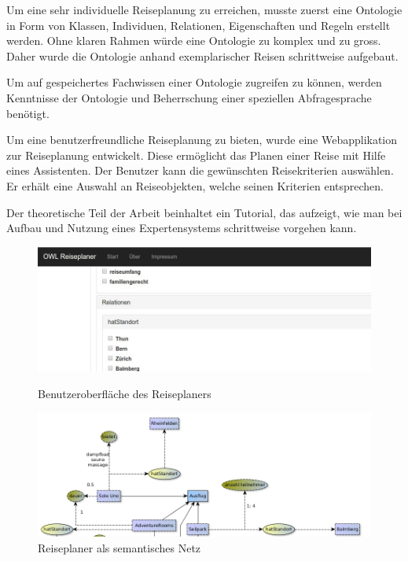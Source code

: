 \documentclass[
    paper=a4,               %
    fontsize=10pt,          %
    open=right,             %
    titlepage=false,        %
    parskip=half,           %
]{scrreprt}                 %
\begin{document}
\begin{multicols}{3}
        Um eine sehr individuelle Reiseplanung zu erreichen, musste zuerst eine Ontologie in Form von Klassen, Individuen, Relationen, Eigenschaften und Regeln erstellt werden. Ohne klaren Rahmen würde eine Ontologie zu komplex und zu gross. Daher wurde die Ontologie anhand exemplarischer Reisen schrittweise aufgebaut.

        Um auf gespeichertes Fachwissen einer Ontologie zugreifen zu können, werden Kenntnisse der Ontologie und Beherrschung einer speziellen Abfragesprache benötigt.

        Um eine benutzerfreundliche Reiseplanung zu bieten, wurde eine Webapplikation zur Reiseplanung entwickelt. Diese ermöglicht das Planen einer Reise mit Hilfe eines Assistenten. Der Benutzer kann die gewünschten Reisekriterien auswählen. Er erhält eine Auswahl an Reiseobjekten, welche seinen Kriterien entsprechen.

       Der theoretische Teil der Arbeit beinhaltet ein Tutorial, das aufzeigt, wie man bei Aufbau und Nutzung eines Expertensystems schrittweise vorgehen kann.

    \end{multicols}

    \begin{figure}[htbp]
        \begin{minipage}[hbt]{0,49\textwidth}
            \centering
            \includegraphics[scale=0.3]{bilder/reiseplaner_gui.jpg}
            \caption*{Benutzeroberfläche des Reiseplaners}
        \end{minipage}
        \begin{minipage}[hbt]{0,49\textwidth}
            \centering
            \includegraphics[scale=0.3]{bilder/semantisches_netz.jpg}
            \caption*{Reiseplaner als semantisches Netz}
        \end{minipage}
    \end{figure}
\end{document}
